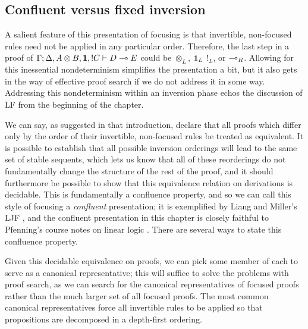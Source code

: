 \subsection{Confluent versus fixed inversion}
\label{sec:confluent-v-fixed}

A salient feature of this presentation of focusing is that invertible,
non-focused rules need not be applied in any particular order.
Therefore, the last step in a proof of ${\Gamma};{\Delta, A
  \otimes B, \mathbf{1}, {!}C} \vdash {D \multimap E} \mathstrut$ could be ${\otimes}_L$,
${\mathbf{1}}_L$ ${!}_L$, or ${\multimap}_R$. Allowing for this inessential
nondeterminism simplifies the presentation a bit, but it also gets in
the way of effective proof search if we do not address it in some way.
Addressing this nondeterminism within an inversion phase echos the
discussion of LF from the beginning of the chapter. 

We can say, as suggested in that introduction, declare that all
proofs which differ only by the order of their invertible, non-focused
rules be treated as equivalent. It is possible to establish that all
possible inversion orderings will lead to the same set of stable
sequents, which lets us know that all of these reorderings do not
fundamentally change the structure of the rest of the proof, and it
should furthermore be possible to show that this equivalence relation
on derivations is decidable. This is fundamentally a confluence
property, and so we can call this style of focusing a {\it confluent}
presentation; it is exemplified by Liang and Miller's LJF
\cite{liang09focusing}, and the confluent presentation in this chapter
is closely faithful to Pfenning's course notes on linear logic
\cite{pfenning12chaining}.  There are several ways to state this
confluence property.

%

Given this decidable equivalence on proofs, we can pick some member of
each to serve as a canonical representative; this will suffice
to solve the problems with proof search, as we can search for 
the canonical representatives of focused proofs rather than the 
much larger set of all focused proofs. The most common canonical
representatives force all invertible rules to be applied so that
propositions are decomposed in a depth-first ordering. 

